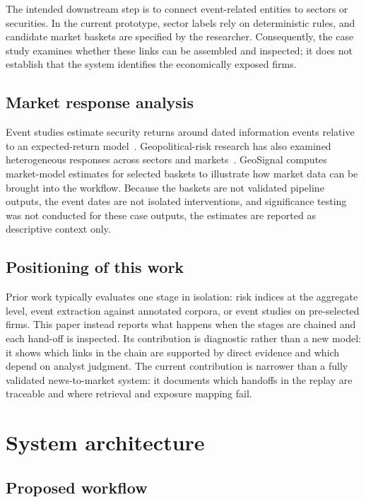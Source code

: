 \documentclass[10pt,a4paper,twocolumn]{article}
\begin{document}
The intended downstream step is to connect event-related entities to sectors or securities. In the current prototype, sector labels rely on deterministic rules, and candidate market baskets are specified by the researcher. Consequently, the case study examines whether these links can be assembled and inspected; it does not establish that the system identifies the economically exposed firms.

\subsection{Market response analysis}

Event studies estimate security returns around dated information events relative to an expected-return model~\cite{MacKinlay1997}. Geopolitical-risk research has also examined heterogeneous responses across sectors and markets~\cite{Choi2024,HassanEtAl2022}. GeoSignal computes market-model estimates for selected baskets to illustrate how market data can be brought into the workflow. Because the baskets are not validated pipeline outputs, the event dates are not isolated interventions, and significance testing was not conducted for these case outputs, the estimates are reported as descriptive context only.

\subsection{Positioning of this work}

Prior work typically evaluates one stage in isolation: risk indices at the aggregate level, event extraction against annotated corpora, or event studies on pre-selected firms. This paper instead reports what happens when the stages are chained and each hand-off is inspected. Its contribution is diagnostic rather than a new model: it shows which links in the chain are supported by direct evidence and which depend on analyst judgment.
The current contribution is narrower than a fully validated news-to-market system: it documents which handoffs in the replay are traceable and where retrieval and exposure mapping fail.

\section{System architecture}\label{sec:system}

\subsection{Proposed workflow}
\end{document}
